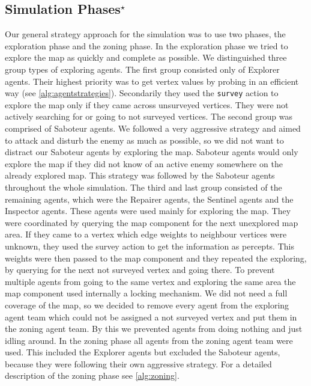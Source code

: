 \subsection[Simulation Phases]{Simulation Phases$^{\star}$}\label{arc:simulation}
Our general strategy approach for the simulation was to use two phases, the exploration phase and the zoning phase. In the exploration phase we tried to explore the map as quickly and complete as possible. We distinguished three group types of exploring agents. The first group consisted only of Explorer agents. Their highest priority was to get vertex values by probing in an efficient way (see \autoref{alg:agentstrategies}). Secondarily they used the \texttt{survey} action to explore the map only if they came across unsurveyed vertices. They were not actively searching for or going to not surveyed vertices. The second group was comprised of Saboteur agents. We followed a very aggressive strategy and aimed to attack and disturb the enemy as much as possible, so we did not want to distract our Saboteur agents by exploring the map. Saboteur agents would only explore the map if they did not know of an active enemy somewhere on the already explored map. This strategy was followed by the Saboteur agents throughout the whole simulation. The third and last group consisted of the remaining agents, which were the Repairer agents, the Sentinel agents and the Inspector agents. These agents were used mainly for exploring the map. They were coordinated by querying the map component for the next unexplored map area. If they came to a vertex which edge weights to neighbour vertices were unknown, they used the survey action to get the information as percepts. This weights were then passed to the map component and they repeated the exploring, by querying for the next not surveyed vertex and going there. To prevent multiple agents from going to the same vertex and exploring the same area the map component used internally a locking mechanism. We did not need a full coverage of the map, so we decided to remove every agent from the exploring agent team which could not be assigned a not surveyed vertex and put them in the zoning agent team. By this we prevented agents from doing nothing and just idling around. In the zoning phase all agents from the zoning agent team were used. This included the Explorer agents but excluded the Saboteur agents, because they were following their own aggressive strategy. For a detailed description of the zoning phase see \autoref{alg:zoning}.

